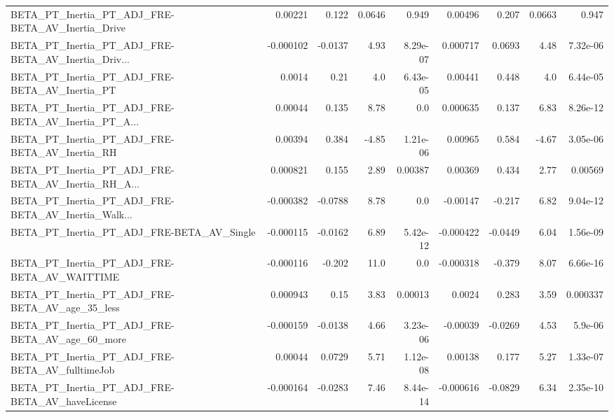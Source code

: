 \begin{tabular}{lrrrrrrrr}
BETA\_PT\_Inertia\_PT\_ADJ\_FRE-BETA\_AV\_Inertia\_Drive   &     0.00221 &        0.122 &   0.0646 &    0.949 &    0.00496 &       0.207 &       0.0663 &         0.947 \\
BETA\_PT\_Inertia\_PT\_ADJ\_FRE-BETA\_AV\_Inertia\_Driv... &   -0.000102 &      -0.0137 &     4.93 & 8.29e-07 &   0.000717 &      0.0693 &         4.48 &      7.32e-06 \\
BETA\_PT\_Inertia\_PT\_ADJ\_FRE-BETA\_AV\_Inertia\_PT      &      0.0014 &         0.21 &      4.0 & 6.43e-05 &    0.00441 &       0.448 &          4.0 &      6.44e-05 \\
BETA\_PT\_Inertia\_PT\_ADJ\_FRE-BETA\_AV\_Inertia\_PT\_A... &     0.00044 &        0.135 &     8.78 &      0.0 &   0.000635 &       0.137 &         6.83 &      8.26e-12 \\
BETA\_PT\_Inertia\_PT\_ADJ\_FRE-BETA\_AV\_Inertia\_RH      &     0.00394 &        0.384 &    -4.85 & 1.21e-06 &    0.00965 &       0.584 &        -4.67 &      3.05e-06 \\
BETA\_PT\_Inertia\_PT\_ADJ\_FRE-BETA\_AV\_Inertia\_RH\_A... &    0.000821 &        0.155 &     2.89 &  0.00387 &    0.00369 &       0.434 &         2.77 &       0.00569 \\
BETA\_PT\_Inertia\_PT\_ADJ\_FRE-BETA\_AV\_Inertia\_Walk... &   -0.000382 &      -0.0788 &     8.78 &      0.0 &   -0.00147 &      -0.217 &         6.82 &      9.04e-12 \\
BETA\_PT\_Inertia\_PT\_ADJ\_FRE-BETA\_AV\_Single          &   -0.000115 &      -0.0162 &     6.89 & 5.42e-12 &  -0.000422 &     -0.0449 &         6.04 &      1.56e-09 \\
BETA\_PT\_Inertia\_PT\_ADJ\_FRE-BETA\_AV\_WAITTIME        &   -0.000116 &       -0.202 &     11.0 &      0.0 &  -0.000318 &      -0.379 &         8.07 &      6.66e-16 \\
BETA\_PT\_Inertia\_PT\_ADJ\_FRE-BETA\_AV\_age\_35\_less     &    0.000943 &         0.15 &     3.83 &  0.00013 &     0.0024 &       0.283 &         3.59 &      0.000337 \\
BETA\_PT\_Inertia\_PT\_ADJ\_FRE-BETA\_AV\_age\_60\_more     &   -0.000159 &      -0.0138 &     4.66 & 3.23e-06 &   -0.00039 &     -0.0269 &         4.53 &       5.9e-06 \\
BETA\_PT\_Inertia\_PT\_ADJ\_FRE-BETA\_AV\_fulltimeJob     &     0.00044 &       0.0729 &     5.71 & 1.12e-08 &    0.00138 &       0.177 &         5.27 &      1.33e-07 \\
BETA\_PT\_Inertia\_PT\_ADJ\_FRE-BETA\_AV\_haveLicense     &   -0.000164 &      -0.0283 &     7.46 & 8.44e-14 &  -0.000616 &     -0.0829 &         6.34 &      2.35e-10 \\

\end{tabular}
